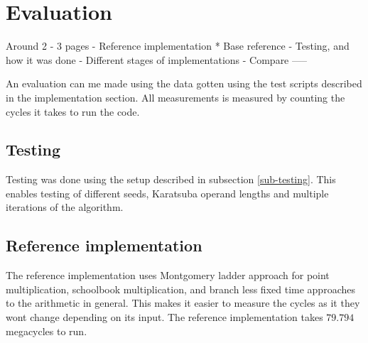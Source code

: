 \section{Evaluation}
	Around 2 - 3 pages
    - Reference implementation
     * Base reference
    - Testing, and how it was done
    - Different stages of implementations
    - Compare
-----



An evaluation can me made using the data gotten using the test scripts described in the implementation section. All measurements is measured by counting the cycles it takes to run the code.

\subsection{Testing}
Testing was done using the setup described in subsection \ref{sub-testing}. This enables testing of different seeds, Karatsuba operand lengths and multiple iterations of the algorithm.


\subsection{Reference implementation}
The reference implementation uses Montgomery ladder approach for point multiplication, schoolbook multiplication, and branch less fixed time approaches to the arithmetic in general. This makes it easier to measure the cycles as it they wont change depending on its input. The reference implementation takes $79.794$ megacycles to run.

